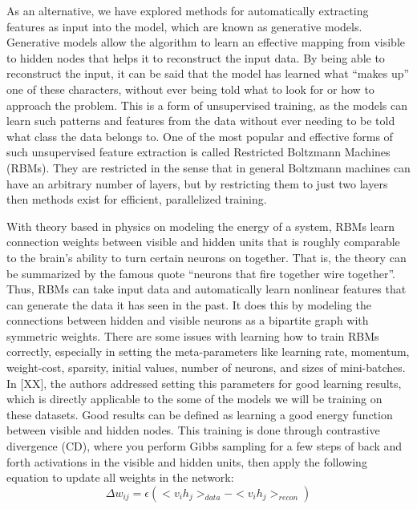 \documentclass[12pt]{article}  %
\begin{document}
As an alternative, we have explored methods for automatically extracting features as input into the model, which are known as generative models.  Generative models allow the algorithm to learn an effective mapping from visible to hidden nodes that helps it to reconstruct the input data.  By being able to reconstruct the input, it can be said that the model has learned what ``makes up” one of these characters, without ever being told what to look for or how to approach the problem.  This is a form of unsupervised training, as the models can learn such patterns and features from the data without ever needing to be told what class the data belongs to.  One of the most popular and effective forms of such unsupervised feature extraction is called Restricted Boltzmann Machines (RBMs).  They are restricted in the sense that in general Boltzmann machines can have an arbitrary number of layers, but by restricting them to just two layers then methods exist for efficient, parallelized training.  

With theory based in physics on modeling the energy of a system, RBMs learn connection weights between visible and hidden units that is roughly comparable to the brain’s ability to turn certain neurons on together.  That is, the theory can be summarized by the famous quote ``neurons that fire together wire together”.  Thus, RBMs can take input data and automatically learn nonlinear features that can generate the data it has seen in the past.  It does this by modeling the connections between hidden and visible neurons as a bipartite graph with symmetric weights.  There are some issues with learning how to train RBMs correctly, especially in setting the meta-parameters like learning rate, momentum, weight-cost, sparsity, initial values, number of neurons, and sizes of mini-batches.  In [XX], the authors addressed setting this parameters for good learning results, which is directly applicable to the some of the models we will be training on these datasets.  Good results can be defined as learning a good energy function between visible and hidden nodes.  This training is done through contrastive divergence (CD), where you perform Gibbs sampling for a few steps of back and forth activations in the visible and hidden units, then apply the following equation to update all weights in the network:
\[
	\Delta w_{ij} = \epsilon ( <v_ih_j>_{data} - <v_ih_j>_{recon})
\]
\end{document}
